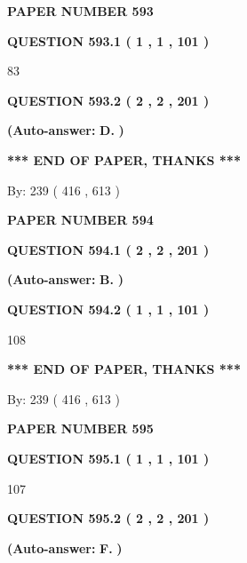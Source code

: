 \documentclass{ctexart}
\begin{document}
   
 {\textbf{ \Large{ PAPER NUMBER  593  }}}
   
   
   
   
  
  
{\textbf{\large{QUESTION
593.1 
 ( 1 , 1 , 101 )
}}}

83
  
  
{\textbf{\large{QUESTION
593.2 
 ( 2 , 2 , 201 )
}}}
 
 
{\textbf{(Auto-answer:}}
{\textbf{\large{
D.}}}
{\textbf{)}}
 
 
   
   
   
   
\vspace{1.0in} 
{\textbf{\large{ *** END OF PAPER, THANKS *** }}} 
   
   
\hspace{1.0in} By: 
 239 ( 416 ,  613 )
   
   
   
   
\newpage 
\setcounter{page}{ 
   594001 } 
   
   
 {\textbf{ \Large{ PAPER NUMBER  594  }}}
   
   
   
   
  
  
{\textbf{\large{QUESTION
594.1 
 ( 2 , 2 , 201 )
}}}
 
 
{\textbf{(Auto-answer:}}
{\textbf{\large{
B.}}}
{\textbf{)}}
 
 
  
  
{\textbf{\large{QUESTION
594.2 
 ( 1 , 1 , 101 )
}}}

108
   
   
   
   
\vspace{1.0in} 
{\textbf{\large{ *** END OF PAPER, THANKS *** }}} 
   
   
\hspace{1.0in} By: 
 239 ( 416 ,  613 )
   
   
   
   
\newpage 
\setcounter{page}{ 
   595001 } 
   
   
 {\textbf{ \Large{ PAPER NUMBER  595  }}}
   
   
   
   
  
  
{\textbf{\large{QUESTION
595.1 
 ( 1 , 1 , 101 )
}}}

107
  
  
{\textbf{\large{QUESTION
595.2 
 ( 2 , 2 , 201 )
}}}
 
 
{\textbf{(Auto-answer:}}
{\textbf{\large{
F.}}}
{\textbf{)}}
 
\end{document}
